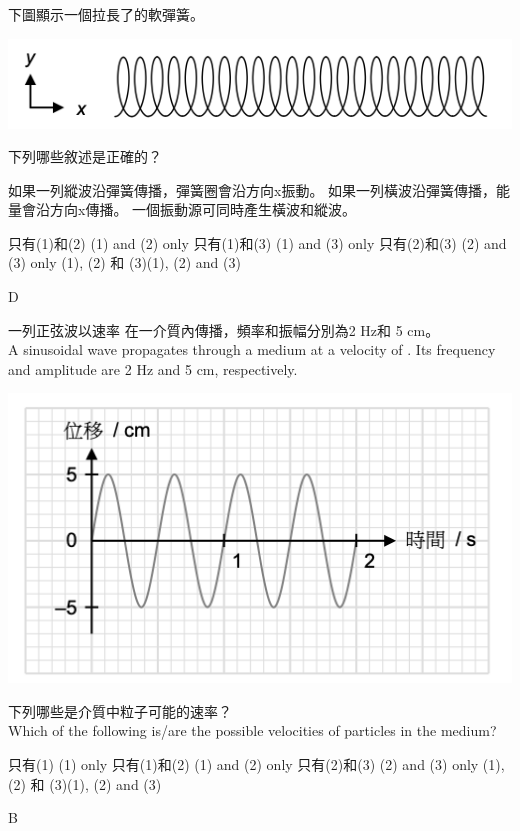 {
    下圖顯示一個拉長了的軟彈簧。
    \par{\par\centering\includegraphics[width=.4\textwidth]{./img/ch1_earlyclass_wave_mc_2024-05-13-16-02-17.png}\par}
    下列哪些敘述是正確的？
    \begin{statements}
        \task 如果一列縱波沿彈簧傳播，彈簧圈會沿方向x振動。
        \task 如果一列橫波沿彈簧傳播，能量會沿方向x傳播。
        \task 一個振動源可同時產生橫波和縱波。
    \end{statements}
    \begin{tasks}
        \task 只有(1)和(2) \tab\tab (1) and (2) only
        \task 只有(1)和(3) \tab\tab (1) and (3) only
        \task 只有(2)和(3) \tab\tab (2) and (3) only
        \task (1), (2) 和 (3)\tab\tab (1), (2) and (3)
    \end{tasks}

}{D}

{
    一列正弦波以速率 在一介質內傳播，頻率和振幅分別為2 Hz和 5 cm。
    \\A sinusoidal wave propagates through a medium at a velocity of . Its frequency and amplitude are 2 Hz and 5 cm, respectively.
    \par{\par\centering\includegraphics[width=.4\textwidth]{./img/ch1_earlyclass_wave_mc_2024-05-13-16-04-17.png}\par}
    下列哪些是介質中粒子可能的速率？\\Which of the following is/are the possible velocities of particles in the medium?
    \begin{statements}
        \task {}
        \task {}
    \end{statements}
    \begin{tasks}
        \task 只有(1) \tab\tab (1) only
        \task 只有(1)和(2) \tab\tab (1) and (2) only
        \task 只有(2)和(3) \tab\tab (2) and (3) only
        \task (1), (2) 和 (3)\tab\tab (1), (2) and (3)
    \end{tasks}

}{B}

